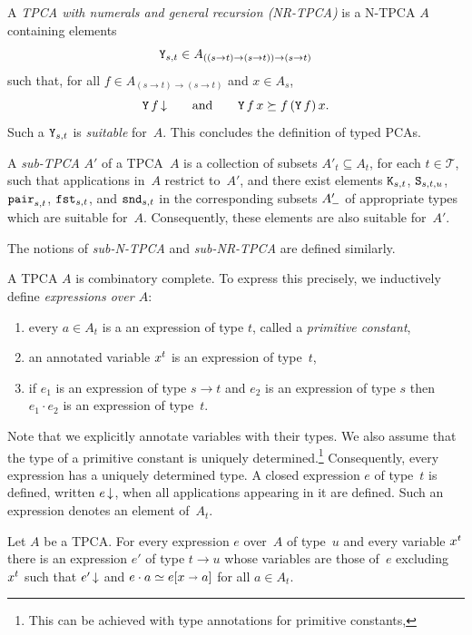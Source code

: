 A \emph{TPCA with numerals and general recursion (NR-TPCA)} is a
N-TPCA $A$ containing elements
%
\begin{equation*}
  \mathtt{Y}_{s,t} \in A_{((s \to t) \to (s \to t)) \to (s \to t)}
\end{equation*}
%
such that, for all $f \in A_{(s \to t) \to (s \to t)}$ and $x \in A_s$,
%
\begin{equation*}
  \mathtt{Y} \, f\,{\downarrow}
  \qquad\text{and}\qquad
  \mathtt{Y} \, f \, x \succeq f \, (\mathtt{Y}\, f) \, x.
\end{equation*}
%
Such a $\mathtt{Y}_{s,t}$ is \emph{suitable} for~$A$. This concludes the
definition of typed PCAs.

A \emph{sub-TPCA} $A'$ of a TPCA~$A$ is a collection of subsets $A'_t
\subseteq A_t$, for each $t \in \mathcal{T}$, such that applications
in~$A$ restrict to~$A'$, and there exist elements
$\mathtt{K}_{s,t}$, $\mathtt{S}_{s,t,u}$, $\mathtt{pair}_{s,t}$, $\mathtt{fst}_{s,t}$,
and $\mathtt{snd}_{s,t}$ in the corresponding subsets $A'_{{-}}$ of
appropriate types which are suitable for~$A$. Consequently, these
elements are also suitable for~$A'$.

The notions of \emph{sub-N-TPCA} and \emph{sub-NR-TPCA} are defined
similarly.

A TPCA $A$ is combinatory complete. To express this precisely, we
inductively define \emph{expressions over $A$}:
%
\begin{enumerate}
\item every $a \in A_t$ is a an expression of type $t$, called a
  \emph{primitive constant},
\item an annotated variable $x^{t}$ is an expression of type~$t$,
\item if $e_1$ is an expression of type $s \to t$ and $e_2$ is an
  expression of type $s$ then $e_1 \cdot e_2$ is an expression of
  type~$t$.
\end{enumerate}
%
Note that we explicitly annotate variables with their types. We also
assume that the type of a primitive constant is uniquely
determined.\footnote{This can be achieved with type annotations for
  primitive constants,} Consequently, every expression has a uniquely
determined type. A closed expression $e$ of type~$t$ is defined,
written $e\,{\downarrow}$, when all applications appearing in it are
defined. Such an expression denotes an element of~$A_t$.

\begin{theorem}
  Let $A$ be a TPCA. For every expression $e$ over~$A$ of type~$u$ and
  every variable $x^{t}$ there is an expression $e'$ of type $t
  \to u$ whose variables are those of~$e$ excluding~$x^{t}$
  such that $e'\,{\downarrow}$ and $e \cdot a \simeq e[x \shortrightarrow
    a]$ for all $a \in A_t$.
\end{theorem}

